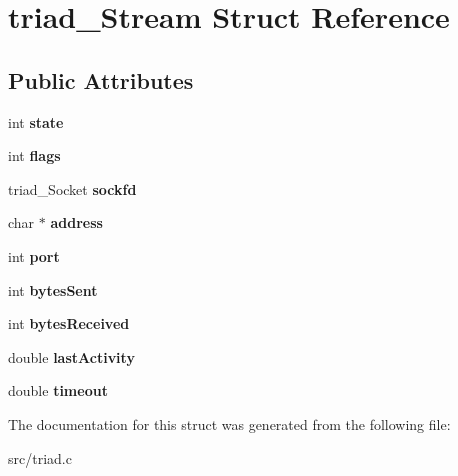 \hypertarget{structtriad___stream}{}\section{triad\+\_\+\+Stream Struct Reference}
\label{structtriad___stream}
\subsection*{Public Attributes}
\begin{DoxyCompactItemize}
\item 
\mbox{\label{structtriad___stream_adfc2f682c99c3fec0de32c7d8fc4d407}} 
int {\bfseries state}
\item 
\mbox{\label{structtriad___stream_aa3fabf70dd44aed35396478d0c0e771f}} 
int {\bfseries flags}
\item 
\mbox{\label{structtriad___stream_a4bb16ae8e601ca23b11edbdbe57d7f71}} 
triad\+\_\+\+Socket {\bfseries sockfd}
\item 
\mbox{\label{structtriad___stream_ad62a7a8c166e0eed083a88e7e560adbc}} 
char $\ast$ {\bfseries address}
\item 
\mbox{\label{structtriad___stream_a458c7456655129283314febe829b14d5}} 
int {\bfseries port}
\item 
\mbox{\label{structtriad___stream_a6433c8eb884264b123894f8882b1ab91}} 
int {\bfseries bytes\+Sent}
\item 
\mbox{\label{structtriad___stream_a26500dcdc8f56828ff551d60e5c16046}} 
int {\bfseries bytes\+Received}
\item 
\mbox{\label{structtriad___stream_ae05902f82185f02f55585c834861e11e}} 
double {\bfseries last\+Activity}
\item 
\mbox{\label{structtriad___stream_a63975379a9a508b92ade862dbed4fd71}} 
double {\bfseries timeout}
\end{DoxyCompactItemize}


The documentation for this struct was generated from the following file\+:\begin{DoxyCompactItemize}
\item 
src/triad.\+c\end{DoxyCompactItemize}
